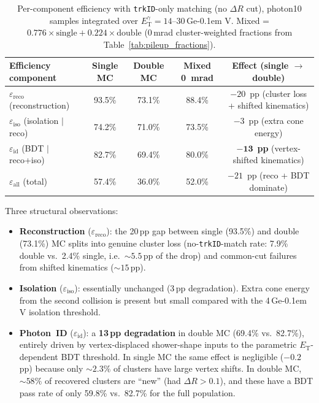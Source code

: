 \documentclass[11pt,a4paper]{article}
\newcommand{\ET}{\ensuremath{E_{\text{T}}}\xspace}
\newcommand{\etg}{\ensuremath{E_{\mathrm{T}}^{\gamma}}\xspace}
\newcommand{\DR}{\ensuremath{\Delta R}\xspace}
\newcommand{\GeV}{\ifmmode {\mathrm{\ Ge\kern -0.1em V}}\else\textrm{Ge\kern -0.1em V}\fi\xspace}
\begin{document}
\begin{table}[H]
    \centering
    \caption{Per-component efficiency with \texttt{trkID}-only matching
      (no $\DR$ cut), photon10 samples integrated over
      $\etg = 14$--$30$\,\GeV. Mixed = $0.776 \times \text{single} +
      0.224 \times \text{double}$ (0\,mrad cluster-weighted fractions
      from Table~\ref{tab:pileup_fractions}).}
    \label{tab:eff_breakdown}
    \begin{tabular}{lcccc}
        \toprule
        Efficiency component & Single MC & Double MC & Mixed 0~mrad & Effect (single $\to$ double) \\
        \midrule
        $\varepsilon_{\text{reco}}$ (reconstruction)
          & 93.5\% & 73.1\% & 88.4\% & $-20$~pp (cluster loss + shifted kinematics) \\
        $\varepsilon_{\text{iso}}$ (isolation $|$ reco)
          & 74.2\% & 71.0\% & 73.5\% & $-3$~pp (extra cone energy) \\
        $\varepsilon_{\text{id}}$ (BDT $|$ reco+iso)
          & 82.7\% & 69.4\% & 80.0\% & $\mathbf{-13}$~\textbf{pp} (vertex-shifted kinematics) \\
        \midrule
        $\varepsilon_{\text{all}}$ (total)
          & 57.4\% & 36.0\% & 52.0\% & $-21$~pp (reco + BDT dominate) \\
        \bottomrule
    \end{tabular}
\end{table}

Three structural observations:

\begin{itemize}
\item \textbf{Reconstruction} ($\varepsilon_{\text{reco}}$): the
  20\,pp gap between single (93.5\%) and double (73.1\%) MC splits into
  genuine cluster loss (no-\texttt{trkID}-match rate: 7.9\% double
  vs.\ 2.4\% single, i.e.\ $\sim\!5.5$\,pp of the drop) and
  common-cut failures from shifted kinematics
  ($\sim\!15$\,pp).
\item \textbf{Isolation} ($\varepsilon_{\text{iso}}$): essentially
  unchanged (3\,pp degradation). Extra cone energy from the second
  collision is present but small compared with the 4\,\GeV isolation
  threshold.
\item \textbf{Photon~ID} ($\varepsilon_{\text{id}}$): a \textbf{13\,pp
  degradation} in double MC (69.4\% vs.\ 82.7\%), entirely driven by
  vertex-displaced shower-shape inputs to the parametric
  $\ET$-dependent BDT threshold. In single MC the same effect is
  negligible ($-0.2$\,pp) because only $\sim\!2.3\%$ of clusters have
  large vertex shifts. In double MC, $\sim\!58\%$ of recovered clusters
  are ``new'' (had $\DR>0.1$), and these have a BDT pass rate of only
  59.8\% vs.\ 82.7\% for the full population.
\end{itemize}
\end{document}
